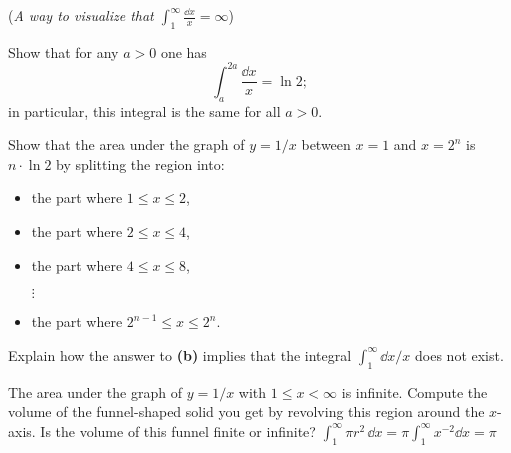 \begin{multicols}{2}
\problem (\textit{A way to visualize that $\int_1^\infty \frac{\dd x} {x}=\infty$}) %

\subprob Show that for any $a>0$ one has
\[
\int_a^{2a} \frac{\dd x} {x} = \ln2;
\]
in particular, this integral is the same for all $a>0$.

\subprob Show that the area under the graph of $y=1/x$ between $x=1$ and $x=2^n$
is $n\cdot \ln 2$ by splitting the region into:
\begin{itemize}
\item the part where $1\leq x\leq 2$,
\item the part where $2\leq x\leq 4$,
\item the part where $4\leq x\leq 8$,
\item[$\vdots$]
\item the part where $2^{n-1}\leq x \leq 2^n$.
\end{itemize}
\subprob Explain how the answer to \textbf{(b)} implies that the integral
$\int_1^\infty \dd x/x$ does not exist.

\problem The area under the graph of $y=1/x$ with $1\leq x <\infty$ is infinite. %
Compute the volume of the funnel-shaped solid you get by revolving this region
around the $x$-axis.  Is the volume of this funnel finite or infinite?
\answer %
$\int_1^\infty \pi r^2\, \dd x = \pi \int_1^\infty x^{-2}\dd x = \pi$
\endanswer



\end{multicols}
\noproblemfont

